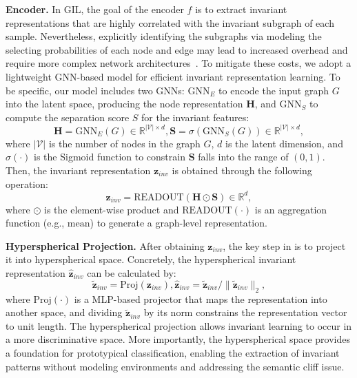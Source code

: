 \noindent\textbf{Encoder.} 
In GIL, the goal of the encoder $f$ is to extract invariant representations that are highly correlated with the invariant subgraph of each sample. Nevertheless, explicitly identifying the subgraphs via modeling the selecting probabilities of each node and edge may lead to increased overhead and require more complex network architectures~\citep{zhuang2023learning}. To mitigate these costs, we adopt a lightweight GNN-based model for efficient invariant representation learning. To be specific, our model includes two GNNs: $\mathrm{GNN}_{E}$ to encode the input graph $G$ into the latent space, producing the node representation $\mathbf{H}$, and $\mathrm{GNN}_{S}$ to compute the separation score $S$ for the invariant features: 
\begin{equation}\label{eq:score}
    \mathbf{H} = \mathrm{GNN}_{E}(G) \in \mathbb{R}^{|\mathcal{V}| \times d}, \mathbf{S} = \sigma(\mathrm{GNN}_{S}(G)) \in \mathbb{R}^{|\mathcal{V}| \times d},
\end{equation}
\noindent where $|\mathcal{V}|$ is the number of nodes in the graph $G$, $d$ is the latent dimension, and $\sigma(\cdot)$ is the Sigmoid function to constrain $\mathbf{S}$ falls into the range of $(0,1)$. Then, the invariant representation $\mathbf{z}_{inv}$ is obtained through the following operation:
\begin{equation}\label{eq:readout}
    \mathbf{z}_{inv} = \mathrm{READOUT}(\mathbf{H} \odot \mathbf{S}) \in \mathbb{R}^{d},
\end{equation}
where $\odot$ is the element-wise product and $\mathrm{READOUT}(\cdot)$ is an aggregation function (e.g., $\mathrm{mean}$) to generate a graph-level representation. 

\noindent\textbf{Hyperspherical Projection.} 
After obtaining $\mathbf{z}_{inv}$, the key step in \ourmethod is to project it into hyperspherical space. Concretely, the hyperspherical invariant representation $\hat{\mathbf{z}}_{inv}$ can be calculated by: 
\begin{equation}
\label{eq: hype_rinv}
    \tilde{\mathbf{z}}_{inv} = \mathrm{Proj}(\mathbf{z}_{inv}), \hat{\mathbf{z}}_{inv} = \tilde{\mathbf{z}}_{inv} / \| \tilde{\mathbf{z}}_{inv}\|_{2}, 
\end{equation}
where $\mathrm{Proj}(\cdot)$ is a MLP-based projector that maps the representation into another space, and dividing $\tilde{\mathbf{z}}_{inv}$ by its norm constrains the representation vector to unit length. The hyperspherical projection allows invariant learning to occur in a more discriminative space. More importantly, the hyperspherical space provides a foundation for prototypical classification, enabling the extraction of invariant patterns without modeling environments and addressing the semantic cliff issue.

